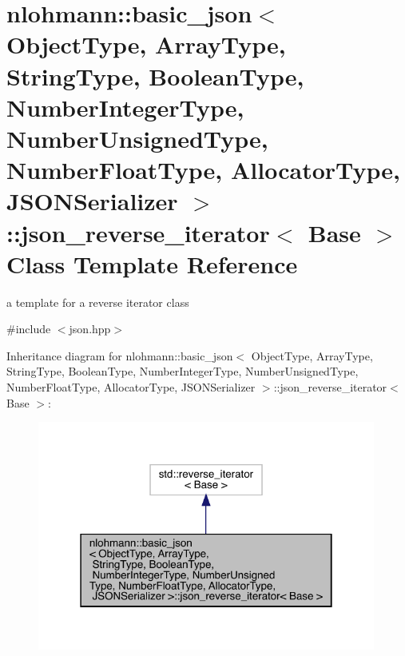 \hypertarget{classnlohmann_1_1basic__json_1_1json__reverse__iterator}{}\section{nlohmann\+::basic\+\_\+json$<$ Object\+Type, Array\+Type, String\+Type, Boolean\+Type, Number\+Integer\+Type, Number\+Unsigned\+Type, Number\+Float\+Type, Allocator\+Type, J\+S\+O\+N\+Serializer $>$\+::json\+\_\+reverse\+\_\+iterator$<$ Base $>$ Class Template Reference}
\label{classnlohmann_1_1basic__json_1_1json__reverse__iterator}


a template for a reverse iterator class  




{\ttfamily \#include $<$json.\+hpp$>$}



Inheritance diagram for nlohmann\+::basic\+\_\+json$<$ Object\+Type, Array\+Type, String\+Type, Boolean\+Type, Number\+Integer\+Type, Number\+Unsigned\+Type, Number\+Float\+Type, Allocator\+Type, J\+S\+O\+N\+Serializer $>$\+::json\+\_\+reverse\+\_\+iterator$<$ Base $>$\+:
\nopagebreak
\begin{figure}[H]
\begin{center}
\leavevmode
\includegraphics[width=315pt]{classnlohmann_1_1basic__json_1_1json__reverse__iterator__inherit__graph}
\end{center}
\end{figure}


